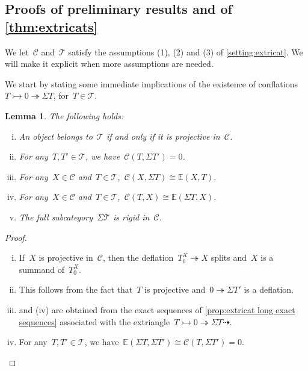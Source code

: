 \documentclass{amsart}
\newtheorem{lemma}[theorem]{Lemma}
\theoremstyle{definition}
\newcommand{\cat}{\mathcal{C}}
\newcommand{\susp}{\Sigma}
\newcommand{\tc}{\mathcal{T}}
\newcommand{\infl}{\rightarrowtail}
\newcommand{\defl}{\twoheadrightarrow}
\begin{document}

\subsection{Proofs of preliminary results and of \cref{thm:extricats}}
\label{sec:proofs extricats}

We let~$\cat$ and~$\tc$ satisfy the assumptions (1), (2) and (3) of \cref{setting:extricat}.
We will make it explicit when more assumptions are needed.

\enlargethispage{-.1cm}
We start by stating some immediate implications of the existence of conflations~$T\infl 0 \defl \susp T$, for~$T\in\tc$.

\begin{lemma}
\label{lem:first consequences}
The following holds:
\begin{enumerate}[(i)]
\item An object belongs to~$\tc$ if and only if it is projective in~$\cat$.
\item For any~$T,T'\in\tc$, we have~$\cat(T,\susp T')=0$.
\item For any~$X\in\cat$ and~$T\in\tc$,~$\cat(X,\susp T)\cong\mathbb{E}(X,T)$.
\item For any~$X\in\cat$ and~$T\in\tc$,~$\cat(T,X)\cong\mathbb{E}(\susp T,X)$.
\item The full subcategory~$\susp\tc$ is rigid in~$\cat$.
\end{enumerate}
\end{lemma}

\begin{proof}
\begin{enumerate}[(i)]
\item If~$X$ is projective in~$\cat$, then the deflation~$T_0^X\defl X$ splits and~$X$ is a summand of~$T_0^X$.
\item This follows from the fact that~$T$ is projective and~$0\defl\susp T'$ is a deflation.
\item and (iv) are obtained from the exact sequences of \cref{prop:extricat long exact sequences} associated with the extriangle~$T\infl 0\defl \susp T\dashrightarrow$.
\addtocounter{enumi}{1}
\item For any~$T,T'\in\tc$, we have~$\mathbb{E}(\susp T,\susp T') \cong \cat(T,\susp T')=0$.
\qedhere
\end{enumerate}
\end{proof}
\end{document}

